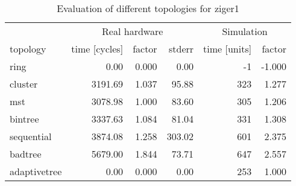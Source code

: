 \begin{table}[htb]
  \centering
  \begin{tabular}{lrrrrr}
  \toprule
  & \multicolumn{3}{c}{Real hardware} & \multicolumn{2}{c}{Simulation} \\
  topology & time [cycles] & factor & stderr & time [units] & factor \\
  \midrule
  ring & 0.00 & 0.000 & 0.00 & -1 & -1.000 \\
  cluster & 3191.69 & 1.037 & 95.88 & 323 & 1.277 \\
  mst & 3078.98 & 1.000 & 83.60 & 305 & 1.206 \\
  bintree & 3337.63 & 1.084 & 81.04 & 331 & 1.308 \\
  sequential & 3874.08 & 1.258 & 303.02 & 601 & 2.375 \\
  badtree & 5679.00 & 1.844 & 73.71 & 647 & 2.557 \\
  adaptivetree & 0.00 & 0.000 & 0.00 & 253 & 1.000 \\
  \midrule
  \end{tabular}
  \caption{Evaluation of different topologies for ziger1}
  \label{tab:ziger1}
\end{table}
